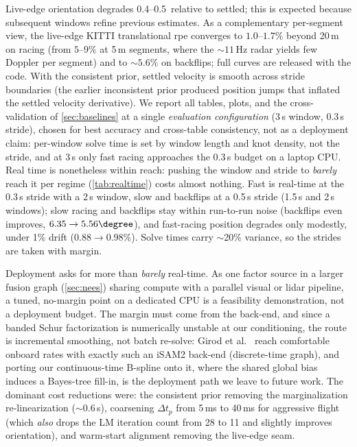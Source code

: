 Live-edge orientation degrades 0.4--0.5\degree\ relative to settled;
this is expected because subsequent windows refine previous estimates.
As a complementary per-segment view, the live-edge KITTI translational
\ac{rpe} converges to $1.0$--$1.7\%$ beyond 20\,m on racing (from
$5$--$9\%$ at 5\,m segments, where the ${\sim}11$\,Hz radar yields few
Doppler per segment) and to ${\sim}5.6\%$ on backflips; full curves are
released with the code.
With the consistent prior, settled velocity is smooth across stride
boundaries (the earlier inconsistent prior produced position jumps
that inflated the settled velocity derivative).
We report all tables, plots, and the cross-validation of
\autoref{sec:baselines} at a single \emph{evaluation configuration}
(3\,s window, 0.3\,s stride), chosen for best accuracy and cross-table
consistency, not as a deployment claim: per-window solve time is set
by window length and knot density, not the stride, and at 3\,s only fast
racing approaches the 0.3\,s budget on a laptop CPU.  Real time is
nonetheless within reach: pushing the window and stride to \emph{barely}
reach it per regime (\autoref{tab:realtime}) costs almost nothing.
Fast is real-time at the 0.3\,s stride with a 2\,s window, slow and
backflips at a 0.5\,s stride (1.5\,s and 2\,s windows); slow racing and
backflips stay within run-to-run noise (backflips even improves,
$6.35\to5.56\degree$), and fast-racing position degrades only modestly,
under 1\% drift ($0.88\to0.98\%$).  Solve times carry $\sim$20\% variance,
so the strides are taken with margin.

Deployment asks for more than \emph{barely} real-time.  As one factor source
in a larger fusion graph (\autoref{sec:nees}) sharing compute with a parallel
visual or lidar pipeline, a tuned, no-margin point on a dedicated CPU is a
feasibility demonstration, not a deployment budget.  The margin must come from
the back-end, and since a banded Schur factorization is numerically unstable
at our conditioning, the route is incremental smoothing, not batch re-solve:
Girod et al.~\cite{girod2024brio} reach comfortable onboard rates with exactly
such an iSAM2 back-end (discrete-time graph), and porting our continuous-time
B-spline onto it, where the shared global bias induces a Bayes-tree fill-in,
is the deployment path we leave to future work.
The dominant cost reductions were: the consistent prior removing
the marginalization re-linearization ($\sim$0.6\,s), coarsening
$\Delta t_p$ from 5\,ms to 40\,ms for aggressive flight (which
\emph{also} drops the LM iteration count from 28 to 11 and slightly
improves orientation), and warm-start alignment removing the
live-edge seam.

